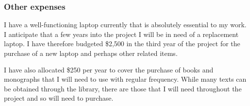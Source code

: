 \documentclass[12pt]{article}
\begin{document}
\subsubsection*{Other expenses}



I have a well-functioning laptop currently that is absolutely essential to my work. I anticipate that a few years into the project I will be in need of a replacement laptop. I have therefore budgeted \$2,500 in the third year of the project for the purchase of a new laptop and perhaps other related items.

I have also allocated \$250 per year to cover the purchase of books and monographs that I will need to use with regular frequency. While many texts can be obtained through the library, there are those that I will need throughout the project and so will need to purchase.
\end{document}
